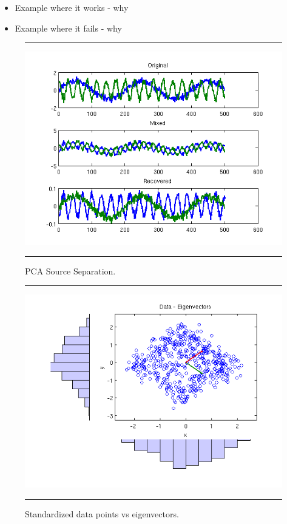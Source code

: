 \documentclass[11pt, oneside, a4paper]{report}
\begin{document}
\begin{itemize}
  \item Example where it works - why
  \item Example where it fails - why
\end{itemize}



\begin{figure}
  \centering
  \hrule
  \includegraphics[width = .9\textwidth]{Figures/pca_signal_time_series}
  \hrule
  \caption{PCA Source Separation.}
  \label{pca_time_series}
\end{figure}

\begin{figure}
  \centering
  \hrule
  \includegraphics[width = .9\textwidth]{Figures/pca_data_eigs}
  \hrule
  \caption{Standardized data points vs eigenvectors.}
\end{figure}
\end{document}
